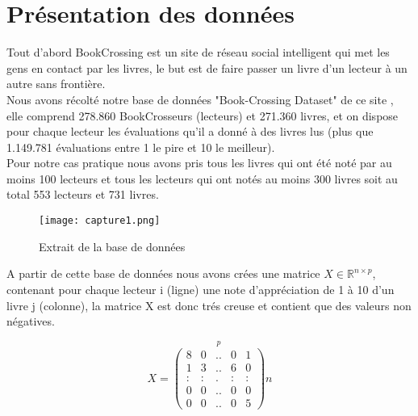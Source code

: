 \documentclass[12pt,letterpaper,twocolumn]{article}
\begin{document}
\par \vspace{1mm}  %



\section{Présentation des données}
\justify

Tout d'abord BookCrossing est un site de réseau social intelligent qui met les gens en contact par les livres, le but est de faire passer un livre d'un lecteur à un autre sans frontière. \\
Nous avons récolté notre base de données "Book-Crossing Dataset" de ce site \cite{Site}, elle comprend 278.860 BookCrosseurs (lecteurs) et 271.360 livres, et on dispose pour chaque lecteur les évaluations qu'il a donné à des livres lus (plus que 1.149.781 évaluations entre 1 le pire et 10 le meilleur). \\
Pour notre cas pratique nous avons pris tous les livres qui ont été noté par au moins 100 lecteurs et tous les lecteurs qui ont notés au moins 300 livres soit au total 553 lecteurs et 731 livres. \\

\begin{figure}[!h]
\centering
\texttt{[image: capture1.png]}
\caption{Extrait de la base de données}
\end{figure}

A partir de cette base de données nous avons crées une matrice $X \in \mathbb{R}^{n\times p}$, contenant pour chaque lecteur i (ligne) une note d’appréciation de 1 à 10 d'un livre j (colonne), la matrice X est donc trés creuse et contient que des valeurs non négatives.

$$ X = \overset{p}{\begin{pmatrix}
 8&  0&  ..&   0& 1\\ 
 1&  3&  ..&   6& 0\\ 
 :&   :&  .&  :&: \\ 
 0& 0 &  ..&  0&0 \\ 
 0&  0&  ..&   0&5 
\end{pmatrix}}n $$ \\
\end{document}
